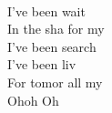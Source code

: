   \\
I've been wait \\
In the sha for my  \\
I've been search \\
I've been liv \\
For tomor all my  \\
Ohoh Oh

